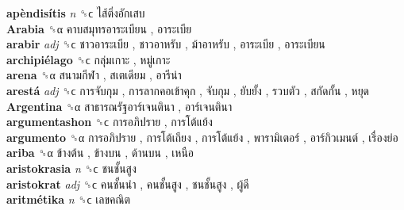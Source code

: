 \textbf{apèndisítis} \emph{n}  ␝ϲ   ไส้ติ่งอักเสบ   \\
\textbf{Arabia} ␝α   คาบสมุทรอาระเบียน ,  อาระเบีย   \\
\textbf{arabir} \emph{adj}  ␝ϲ   ชาวอาระเบีย ,  ชาวอาหรับ ,  ม้าอาหรับ ,  อาระเบีย ,  อาระเบียน   \\
\textbf{archipiélago} ␝ϲ   กลุ่มเกาะ ,  หมู่เกาะ   \\
\textbf{arena} ␝α   สนามกีฬา ,  สเตเดียม ,  อารีน่า   \\
\textbf{arestá} \emph{adj}  ␝ϲ   การจับกุม ,  การลากคอเข้าคุก ,  จับกุม ,  ยับยั้ง ,  รวบตัว ,  สกัดกั้น ,  หยุด   \\
\textbf{Argentina} ␝α   สาธารณรัฐอาร์เจนตินา ,  อาร์เจนตินา   \\
\textbf{argumentashon} ␝ϲ   การอภิปราย ,  การโต้แย้ง   \\
\textbf{argumento} ␝α   การอภิปราย ,  การโต้เถียง ,  การโต้แย้ง ,  พารามิเตอร์ ,  อาร์กิวเมนต์ ,  เรื่องย่อ   \\
\textbf{ariba} ␝α   ข้างต้น ,  ข้างบน ,  ด้านบน ,  เหนือ   \\
\textbf{aristokrasia} \emph{n}  ␝ϲ   ชนชั้นสูง   \\
\textbf{aristokrat} \emph{adj}  ␝ϲ   คนชั้นนำ ,  คนชั้นสูง ,  ชนชั้นสูง ,  ผู้ดี   \\
\textbf{aritmétika} \emph{n}  ␝ϲ   เลขคณิต   \\
